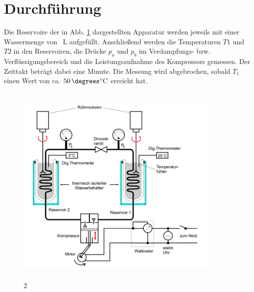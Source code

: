 \section{Durchführung}
\label{sec:Durchführung}

Die Reservoire der in Abb. \ref{fig:aufbau2} dargestellten Apparatur werden jeweils mit einer Wassermenge von 
\SI{}{\liter} aufgefüllt. Anschließend werden die Temperaturen $T1$ und $T2$ in den 
Reservoiren, die Drücke $p_a$ und $p_b$ im Verdampfungs- bzw. Verflüssigungsbereich und 
die Leistungsaufnahme des Kompressors gemessen. Der Zeittakt beträgt dabei eine Minute. 
Die Messung wird abgebrochen, sobald $T_1$ einen Wert von ca. $\SI{50}{\degrees\celsius}$ 
erreicht hat. 
\begin{figure}
    \centering
    \includegraphics[width=10cm, height=10cm]{build/2.png}
    \caption{2}
    \label{fig:aufbau2}
\end{figure}